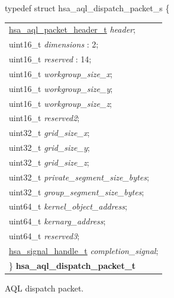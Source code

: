 \documentclass[final]{book}
\newcommand{\reffld}[1]{\textit{#1}}
\begin{document}
\noindent\begin{tcolorbox}[breakable,nobeforeafter,arc=0mm,colframe=white,colback=lightgray,left=0mm]
typedef struct  hsa_aql_dispatch_packet_s \{
\vspace{-3.5mm}\begin{longtable}{@{}p{\textwidth}}
\hspace{1.7em}\hyperlink{group__aql_1ga92558e047d003985bae2558febd3dd40}{hsa_aql_packet_header_t} \reffld{header};\\
\hspace{1.7em}uint16_t \reffld{dimensions} : 2;\\
\hspace{1.7em}uint16_t \reffld{reserved} : 14;\\
\hspace{1.7em}uint16_t \reffld{workgroup_size_x};\\
\hspace{1.7em}uint16_t \reffld{workgroup_size_y};\\
\hspace{1.7em}uint16_t \reffld{workgroup_size_z};\\
\hspace{1.7em}uint16_t \reffld{reserved2};\\
\hspace{1.7em}uint32_t \reffld{grid_size_x};\\
\hspace{1.7em}uint32_t \reffld{grid_size_y};\\
\hspace{1.7em}uint32_t \reffld{grid_size_z};\\
\hspace{1.7em}uint32_t \reffld{private_segment_size_bytes};\\
\hspace{1.7em}uint32_t \reffld{group_segment_size_bytes};\\
\hspace{1.7em}uint64_t \reffld{kernel_object_address};\\
\hspace{1.7em}uint64_t \reffld{kernarg_address};\\
\hspace{1.7em}uint64_t \reffld{reserved3};\\
\hspace{1.7em}\hyperlink{group__signals_1ga6592c136d70853d855bc11d9efdbf534}{hsa_signal_handle_t} \reffld{completion_signal};\\
\}  \hypertarget{group__aql_1gab3d5ded5ac53f70931768468c0c0cfd6}{\textbf{hsa_aql_dispatch_packet_t}}
\end{longtable}

\end{tcolorbox}
AQL dispatch packet.
\end{document}
